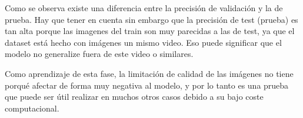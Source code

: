 \quad

\noindent
Como se observa existe una diferencia entre la precisión de validación y la de prueba.
Hay que tener en cuenta sin embargo que la precisión de test (prueba) es tan alta porque
las imagenes del train son muy parecidas a las de test, ya que el dataset está hecho con imágenes
un mismo video. Eso puede significar que el modelo no generalize fuera de este video o similares.

\quad

\noindent
Como aprendizaje de esta fase, la limitación de calidad de las imágenes no tiene porqué afectar
de forma muy negativa al modelo, y por lo tanto es una prueba que puede ser útil realizar en muchos 
otros casos debido a su bajo coste computacional.
\quad
